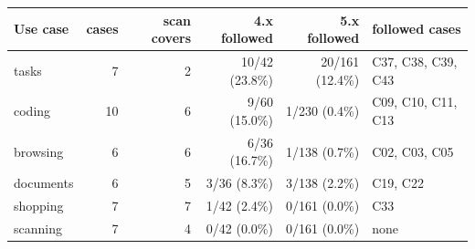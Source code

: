\begin{tabularx}{\linewidth}{@{}P{2.6cm}rrrrL@{}}\toprule
Use case & cases & scan covers & 4.x followed & 5.x followed & followed cases\\\midrule
tasks & 7 & 2 & 10/42 (23.8\%) & 20/161 (12.4\%) & C37, C38, C39, C43\\
coding & 10 & 6 & 9/60 (15.0\%) & 1/230 (0.4\%) & C09, C10, C11, C13\\
browsing & 6 & 6 & 6/36 (16.7\%) & 1/138 (0.7\%) & C02, C03, C05\\
documents & 6 & 5 & 3/36 (8.3\%) & 3/138 (2.2\%) & C19, C22\\
shopping & 7 & 7 & 1/42 (2.4\%) & 0/161 (0.0\%) & C33\\
scanning & 7 & 4 & 0/42 (0.0\%) & 0/161 (0.0\%) & none\\
\bottomrule
\end{tabularx}
